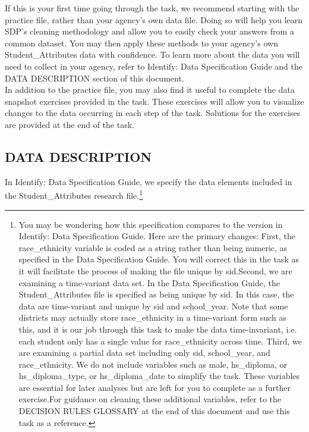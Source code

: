\documentclass[12pt]{article}
\begin{document}
If this is your first time going through the task, we recommend starting with the practice file, rather than your agency's own 
data file.  Doing so will help you learn SDP's cleaning methodology and allow you to easily check your answers from a common 
dataset.  You may then apply these methods to your agency's own Student\_Attributes data with confidence.  To learn more about 
the data you will need to collect in your agency, refer to Identify: Data Specification Guide and the DATA DESCRIPTION section of 
this document.\\

In addition to the practice file, you may also find it useful to complete the data snapshot exercises provided in the task.  These 
exercises will allow you to visualize changes to the data occurring in each step of the task.  Solutions for the exercises are 
provided at the end of the task. 

\subsection{DATA DESCRIPTION}
In Identify: Data Specification Guide, we specify the data elements included in the Student\_Attributes research file.\footnote{
You may be wondering how  this specification compares to the  version in Identify: Data Specification Guide. Here are the primary changes:
First, the race\_ethnicity variable is coded as a string rather than being numeric, as specified in the Data Specification Guide.  You will correct this in the task as it will facilitate the process of making the file unique by sid.Second, we are examining a time-variant data set. In the Data Specification Guide, the Student\_Attributes file is specified as being unique by sid.  In this case, the data are time-variant and unique by sid and school\_year. Note that some districts may actually store race\_ethnicity in a time-variant form such as this, and it is our job through this task to make the data time-invariant, i.e. each student only has a single value for race\_ethnicity across time. Third, we are examining a partial data set including only sid, school\_year, and race\_ethnicity.  We do not include variables such as male, hs\_diploma, or hs\_diploma\_type, or hs\_diploma\_date to simplify the task.  These variables are essential for later analyses but are left for you to complete as a further exercise.For guidance on cleaning these additional variables, refer to the DECISION RULES GLOSSARY at the end of this document and use this task as a reference.} \\
\end{document}
